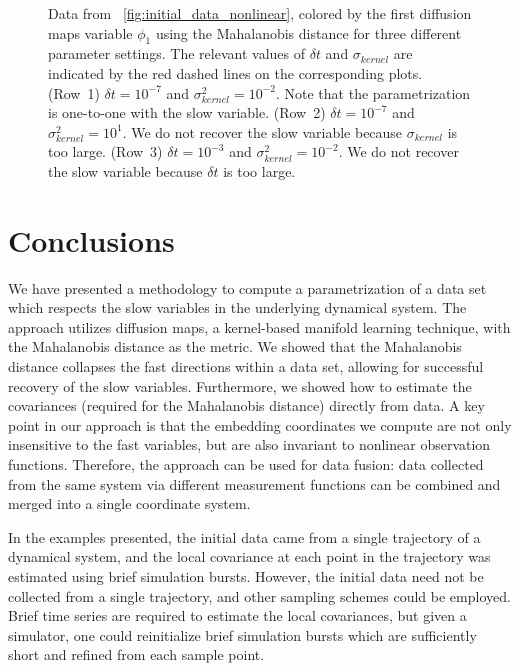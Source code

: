 \begin{figure}[t]
\caption[Comparison of results for different parameter settings]{Data from \fig~\ref{fig:initial_data_nonlinear}, colored by the first diffusion maps variable $\phi_1$ using the Mahalanobis distance for three different parameter settings. The relevant values of $\delta t$ and $\sigma_{kernel}$ are indicated by the red dashed lines on the corresponding plots.  (Row~1) $\delta t = 10^{-7}$ and $\sigma_{kernel}^2 = 10^{-2}$. Note that the parametrization is one-to-one with the slow variable.  (Row~2) $\delta t = 10^{-7}$ and $\sigma_{kernel}^2 = 10^{1}$. We do not recover the slow variable because $\sigma_{kernel}$ is too large. (Row~3)  $\delta t = 10^{-3}$ and $\sigma_{kernel}^2 = 10^{-2}$. We do not recover the slow variable because $\delta t$ is too large.  }
\label{fig:colored_data_nonlinear_cases}
\end{figure}


\section{Conclusions}

We have presented a methodology to compute a parametrization of a data set which respects the slow variables in the underlying dynamical system.
%
The approach utilizes diffusion maps, a kernel-based manifold learning technique, with the Mahalanobis distance as the metric.
%
We showed that the Mahalanobis distance collapses the fast directions within a data set, allowing for successful recovery of the slow variables.
%
Furthermore, we showed how to estimate the covariances (required for the Mahalanobis distance) directly from data.
%
A key point in our approach is that the embedding coordinates we compute are not only insensitive to the fast variables, but are also invariant to nonlinear observation functions.
%
Therefore, the approach can be used for data fusion: data collected from the same system via different measurement functions can be combined and merged into a single coordinate system.

In the examples presented, the initial data came from a single trajectory of a dynamical system, and the local covariance at each point in the trajectory was estimated using brief simulation bursts.
%
However, the initial data need not be collected from a single trajectory, and other sampling schemes could be employed.
%
Brief time series are required to estimate the local covariances, but given a simulator, one could reinitialize brief simulation bursts which are sufficiently short and refined from each sample point.

